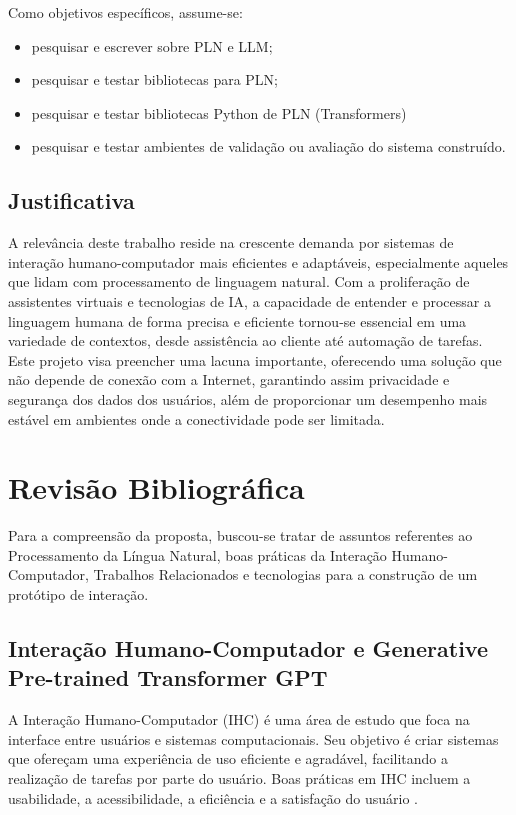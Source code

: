 \documentclass[10pt, conference, compsocconf]{IEEEtran}
\begin{document}
Como objetivos específicos, assume-se:

\begin{itemize}
    \item pesquisar e escrever sobre PLN e LLM; %
    \item pesquisar e testar bibliotecas para PLN;
    \item pesquisar e testar bibliotecas Python de PLN (Transformers)
    \item pesquisar e testar ambientes de validação ou avaliação do sistema construído.
\end{itemize}


\subsection{Justificativa}
A relevância deste trabalho reside na crescente demanda por sistemas de interação humano-computador mais eficientes e adaptáveis, especialmente aqueles que lidam com processamento de linguagem natural. Com a proliferação de assistentes virtuais e tecnologias de IA, a capacidade de entender e processar a linguagem humana de forma precisa e eficiente tornou-se essencial em uma variedade de contextos, desde assistência ao cliente até automação de tarefas. Este projeto visa preencher uma lacuna importante, oferecendo uma solução que não depende de conexão com a Internet, garantindo assim privacidade e segurança dos dados dos usuários, além de proporcionar um desempenho mais estável em ambientes onde a conectividade pode ser limitada.

\section{Revisão Bibliográfica}
Para a compreensão da proposta, buscou-se tratar de assuntos referentes ao Processamento da Língua Natural, boas práticas da Interação Humano-Computador, Trabalhos Relacionados e tecnologias para a construção de um protótipo de interação.

\subsection{Interação Humano-Computador e Generative Pre-trained Transformer GPT}
A Interação Humano-Computador (IHC) é uma área de estudo que foca na interface entre usuários e sistemas computacionais. Seu objetivo é criar sistemas que ofereçam uma experiência de uso eficiente e agradável, facilitando a realização de tarefas por parte do usuário. Boas práticas em IHC incluem a usabilidade, a acessibilidade, a eficiência e a satisfação do usuário \cite{Norman13}.
\end{document}
